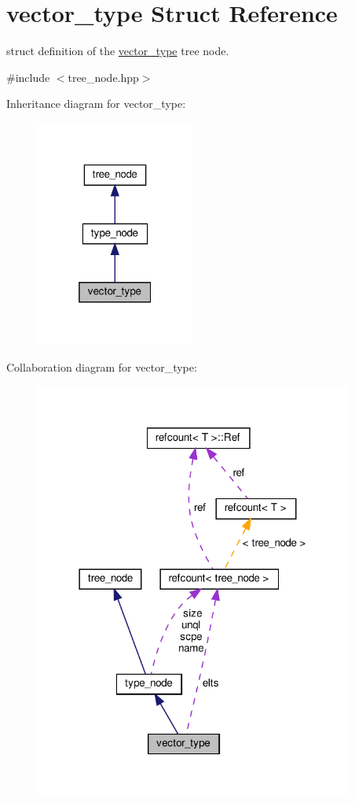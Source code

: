\hypertarget{structvector__type}{}\section{vector\+\_\+type Struct Reference}
\label{structvector__type}


struct definition of the \hyperlink{structvector__type}{vector\+\_\+type} tree node.  




{\ttfamily \#include $<$tree\+\_\+node.\+hpp$>$}



Inheritance diagram for vector\+\_\+type\+:
\nopagebreak
\begin{figure}[H]
\begin{center}
\leavevmode
\includegraphics[width=148pt]{da/d58/structvector__type__inherit__graph}
\end{center}
\end{figure}


Collaboration diagram for vector\+\_\+type\+:
\nopagebreak
\begin{figure}[H]
\begin{center}
\leavevmode
\includegraphics[width=297pt]{d3/d6b/structvector__type__coll__graph}
\end{center}
\end{figure}
